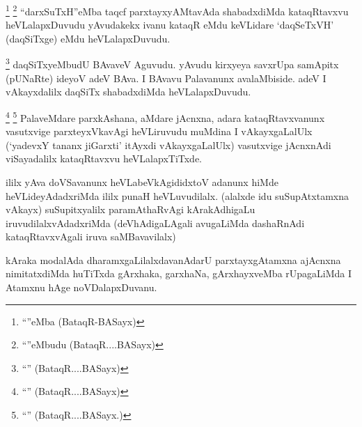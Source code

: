 
\begin{artha}
\footnote{``\stext''eMba (BataqR-BASayx)}
\footnote{``\stext''eMbudu (BataqR....BASayx)}
``darxSuTxH''eMba taqcf parxtayxyAMtavAda shabadxdiMda kataqRtavxvu heVLalapxDuvudu yAvudakekx ivanu kataqR eMdu keVLidare `daqSeTxVH' (daqSiTxge) eMdu heVLalapxDuvudu.
\end{artha}


\begin{artha}
\footnote{``\stext'' (BataqR....BASayx)}
daqSiTxyeMbudU BAvaveV Aguvudu. yAvudu kirxyeya savxrUpa samApitx (pUNaRte) ideyoV adeV BAva. I BAvavu Palavanunx avalaMbiside. adeV I vAkayxdalilx daqSiTx shabadxdiMda heVLalapxDuvudu.
\end{artha}


\begin{artha}
\footnote{``\stext'' (BataqR....BASayx)}
\footnote{``\stext'' (BataqR....BASayx.)}
PalaveMdare parxkAshana, aMdare jAcnxna, adara kataqRtavxvanunx vasutxvige parxteyxVkavAgi heVLiruvudu muMdina I vAkayxgaLalUlx (`yadevxY tananx jiGarxti' itAyxdi vAkayxgaLalUlx) vasutxvige jAcnxnAdi viSayadalilx kataqRtavxvu heVLalapxTiTxde.
\end{artha}



\begin{artha}
ililx yAva doVSavanunx heVLabeVkAgididxtoV adanunx hiMde heVLideyAdadxriMda ililx punaH heVLuvudilalx. (alalxde idu suSupAtxtamxna vAkayx) suSupitxyalilx paramAthaRvAgi kArakAdhigaLu iruvudilalxvAdadxriMda (deVhAdigaLAgali avugaLiMda dashaRnAdi kataqRtavxvAgali iruva saMBavavilalx)
\end{artha}


\begin{artha}
kAraka modalAda dharamxgaLilalxdavanAdarU parxtayxgAtamxna ajAcnxna nimitatxdiMda huTiTxda gArxhaka, garxhaNa, gArxhayxveMba rUpagaLiMda I Atamxnu hAge noVDalapxDuvanu.
\end{artha}


